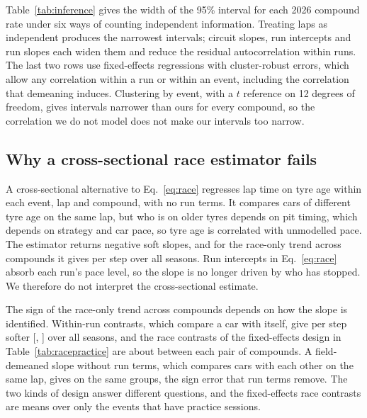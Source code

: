 Table~\ref{tab:inference} gives the width of the 95\% interval for each 2026 compound rate under six ways of counting independent information.
Treating laps as independent produces the narrowest intervals; circuit slopes, run intercepts and run slopes each widen them and reduce the residual autocorrelation within runs.
The last two rows use fixed-effects regressions with cluster-robust errors, which allow any correlation within a run or within an event, including the correlation that demeaning induces.
Clustering by event, with a $t$ reference on 12 degrees of freedom, gives intervals narrower than ours for every compound, so the correlation we do not model does not make our intervals too narrow.

\begin{table}[t]
\centering\footnotesize\setlength{\tabcolsep}{4pt}

\caption{Width of the 95\% interval (s/lap) for each 2026 compound rate under alternative inference. The first four rows are mixed models of Eq.~\eqref{eq:race} with progressively more random effects; ``ours'' is the specification used throughout. The last two rows are regressions with driver-in-event fixed effects and cluster-robust standard errors; they omit the circuit and run terms, so their point estimates differ from the mixed models (for C4 and C5 by about half) and only their widths are compared here. The last column is the residual lag-1 autocorrelation within runs, where defined.}
\label{tab:inference}
\end{table}

\subsection{Why a cross-sectional race estimator fails}\label{app:xs}

A cross-sectional alternative to Eq.~\eqref{eq:race} regresses lap time on tyre age within each event, lap and compound, with no run terms.
It compares cars of different tyre age on the same lap, but who is on older tyres depends on pit timing, which depends on strategy and car pace, so tyre age is correlated with unmodelled pace.
The estimator returns negative soft slopes, and for the race-only trend across compounds it gives \ReconCrossSectionalAll\spl{} per step over all seasons.
Run intercepts in Eq.~\eqref{eq:race} absorb each run's pace level, so the slope is no longer driven by who has stopped.
We therefore do not interpret the cross-sectional estimate.

The sign of the race-only trend across compounds depends on how the slope is identified.
Within-run contrasts, which compare a car with itself, give \ReconWithinRunAll\spl{} per step softer [\ReconWithinRunAllLo, \ReconWithinRunAllHi] over all seasons, and the race contrasts of the fixed-effects design in Table~\ref{tab:racepractice} are about \DidTWFESoftHardRaceContrast\spl{} between each pair of compounds.
A field-demeaned slope without run terms, which compares cars with each other on the same lap, gives \ReconFieldDemeanedAll\spl{} on the same groups, the sign error that run terms remove.
The two kinds of design answer different questions, and the fixed-effects race contrasts are means over only the events that have practice sessions.

